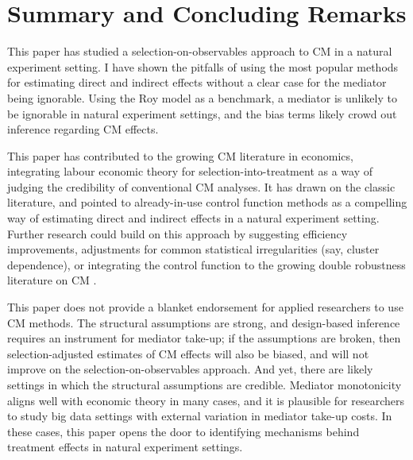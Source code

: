 \section{Summary and Concluding Remarks}
\label{sec:conclusion}

This paper has studied a selection-on-observables approach to CM in a natural experiment setting.
I have shown the pitfalls of using the most popular methods for estimating direct and indirect effects without a clear case for the mediator being ignorable.
Using the Roy model as a benchmark, a mediator is unlikely to be ignorable in natural experiment settings, and the bias terms likely crowd out inference regarding CM effects.

This paper has contributed to the growing CM literature in economics, integrating labour economic theory for selection-into-treatment as a way of judging the credibility of conventional CM analyses.
It has drawn on the classic literature, and pointed to already-in-use control function methods as a compelling way of estimating direct and indirect effects in a natural experiment setting.
Further research could build on this approach by suggesting efficiency improvements, adjustments for common statistical irregularities (say, cluster dependence), or integrating the control function to the growing double robustness literature on CM \citep{farbmacher2022causal,bia2024double}.

This paper does not provide a blanket endorsement for applied researchers to use CM methods.
The structural assumptions are strong, and design-based inference requires an instrument for mediator take-up; if the assumptions are broken, then selection-adjusted estimates of CM effects will also be biased, and will not improve on the selection-on-observables approach.
And yet, there are likely settings in which the structural assumptions are credible.
Mediator monotonicity aligns well with economic theory in many cases, and it is plausible for researchers to study big data settings with external variation in mediator take-up costs.
In these cases, this paper opens the door to identifying mechanisms behind treatment effects in natural experiment settings.
